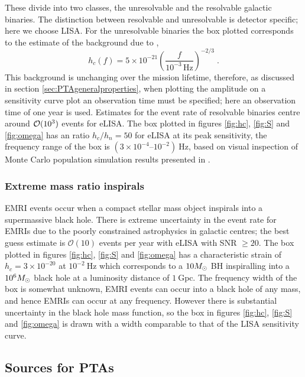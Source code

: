 These divide into two classes, the unresolvable and the resolvable galactic binaries. The distinction between resolvable and unresolvable is detector specific; here we choose LISA. For the unresolvable binaries the box plotted corresponds to the estimate of the background due to \cite{Nelemans},
\begin{equation} h_{c}(f)= 5\times 10^{-21} \left(\frac{f}{10^{-3}\,\textrm{Hz}}\right)^{-2/3} \; . \end{equation}
This background is unchanging over the mission lifetime, therefore, as discussed in section \ref{sec:PTAgeneralproperties}, when plotting the amplitude on a sensitivity curve plot an observation time must be specified; here an observation time of one year is used. Estimates for the event rate of resolvable binaries centre around ${\cal{O}}(10^{3})$ events for eLISA. The box plotted in figures \ref{fig:hc}, \ref{fig:S} and \ref{fig:omega} has an ratio $h_{c}/h_{n}=50$ for eLISA at its peak sensitivity, the frequency range of the box is $\left(3\times10^{-4}\right.$--$\left.10^{-2}\right)~\mathrm{Hz}$, based on visual inspection of Monte Carlo population simulation results presented in \cite{Amaro-Seoane-et-al}.

\subsubsection{Extreme mass ratio inspirals}
EMRI events occur when a compact stellar mass object inspirals into a supermassive black hole. There is extreme uncertainty in the event rate for EMRIs due to the poorly constrained astrophysics in galactic centres; the best guess estimate is ${\mathcal{O}}(10)$ events per year with eLISA with SNR $\ge 20$. The box plotted in figures \ref{fig:hc}, \ref{fig:S} and \ref{fig:omega} has a characteristic strain of $h_{c}=3\times 10^{-20}$ at $10^{-2}~\mathrm{Hz}$ which corresponds to a $10M_{ \odot }$ BH inspiralling into a $10^{6}M_{ \odot }$ black hole at a luminosity distance of $1~\mathrm{Gpc}$. The frequency width of the box is somewhat unknown, EMRI events can occur into a black hole of any mass, and hence EMRIs can occur at any frequency. However there is substantial uncertainty in the black hole mass function, so the box in figures \ref{fig:hc}, \ref{fig:S} and \ref{fig:omega} is drawn with a width comparable to that of the LISA sensitivity curve.




\subsection{Sources for PTAs}

